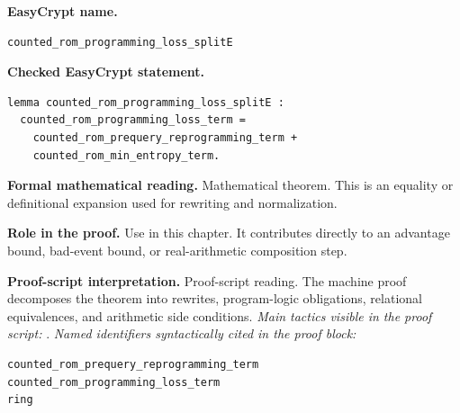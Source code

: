\begin{formaltheorem}
\noindent\textbf{EasyCrypt name.}
\begin{lstlisting}[language=EasyCrypt,basicstyle=\ttfamily\scriptsize]
counted_rom_programming_loss_splitE
\end{lstlisting}
\noindent\textbf{Checked EasyCrypt statement.}
\begin{lstlisting}[language=EasyCrypt,basicstyle=\ttfamily\scriptsize]
lemma counted_rom_programming_loss_splitE :
  counted_rom_programming_loss_term =
    counted_rom_prequery_reprogramming_term +
    counted_rom_min_entropy_term.
\end{lstlisting}
\noindent\textbf{Formal mathematical reading.}
Mathematical theorem. This is an equality or definitional expansion used for rewriting and normalization.

\noindent\textbf{Role in the proof.}
Use in this chapter. It contributes directly to an advantage bound, bad-event bound, or real-arithmetic composition step.

\noindent\textbf{Proof-script interpretation.}
Proof-script reading. The machine proof decomposes the theorem into rewrites, program-logic obligations, relational equivalences, and arithmetic side conditions.
\emph{Main tactics visible in the proof script:} .
\emph{Named identifiers syntactically cited in the proof block:}
\begin{lstlisting}[language=EasyCrypt,basicstyle=\ttfamily\scriptsize]
counted_rom_prequery_reprogramming_term
counted_rom_programming_loss_term
ring
\end{lstlisting}

\end{formaltheorem}


